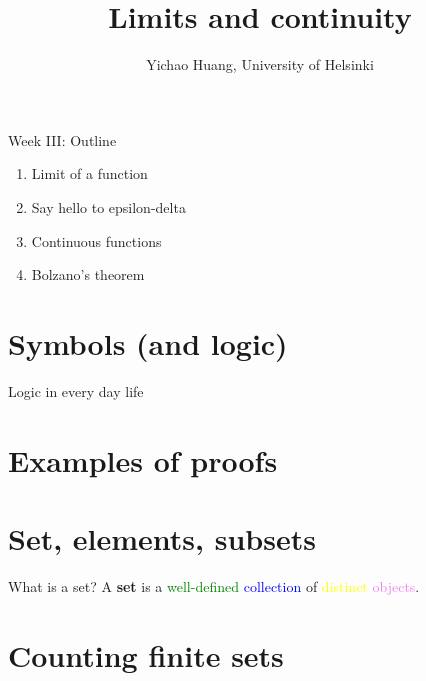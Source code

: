\documentclass[aspectratio=1610]{beamer}
\title{Limits and continuity}
\author{Yichao Huang, University of Helsinki}
\begin{document}
\maketitle

\begin{frame}{Week III: Outline}
\begin{enumerate}
  \item Limit of a function\newline
  \item Say hello to epsilon-delta\newline
  \item Continuous functions\newline
  \item Bolzano's theorem
\end{enumerate}
\end{frame}

\section{Symbols (and logic)}

\begin{frame}{Logic in every day life}
\end{frame}

\section{Examples of proofs}

\section{Set, elements, subsets}

\begin{frame}{What is a set?}
A \textbf{set} is a \textcolor{green}{well-defined} \textcolor{blue}{collection} of \textcolor{yellow}{distinct} \textcolor{violet}{objects}.
\end{frame}

\section{Counting finite sets}
\end{document}
